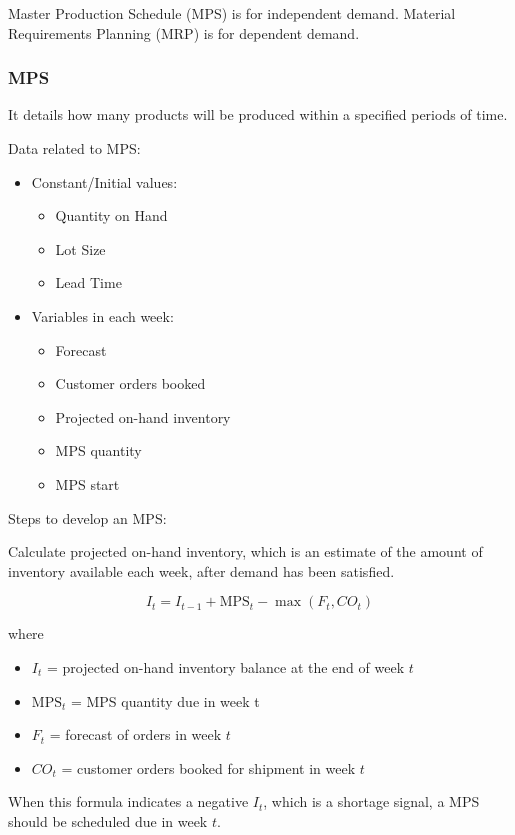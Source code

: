 \documentclass{article}
\newcommand{\red}[1]{\color{red}#1\color{black}\xspace}
\begin{document}
Master Production Schedule (MPS) is for independent demand.
Material Requirements Planning (MRP) is for dependent demand.

\subsubsection{MPS}

It details how many products will be produced within a specified periods of time.

Data related to MPS:
\begin{itemize}
	\item Constant/Initial values:
	      \begin{itemize}
		      \item Quantity on Hand
		      \item Lot Size
		      \item Lead Time
	      \end{itemize}
	\item Variables in each week:
	      \begin{itemize}
		      \item Forecast
		      \item Customer orders booked
		      \item Projected on-hand inventory
		      \item MPS quantity
		      \item MPS start
	      \end{itemize}
\end{itemize}

Steps to develop an MPS:

Calculate projected on-hand inventory, which is an estimate of the amount of inventory available each week,
after demand has been satisfied.

\[
	I_t = I_{t-1} + \text{MPS}_t - \max (F_t, CO_t)
\]

where
\begin{itemize}
	\item $I_t$ = projected on-hand inventory balance at the end of week $t$
	\item $\text{MPS}_t$ = MPS quantity \red{due} in week t
	\item $F_t$ = forecast of orders in week $t$
	\item $CO_t$ = customer orders booked for shipment in week $t$
\end{itemize}

When this formula indicates a negative $I_t$, which is a shortage signal,
a MPS should be scheduled \red{due} in week $t$.
\end{document}
